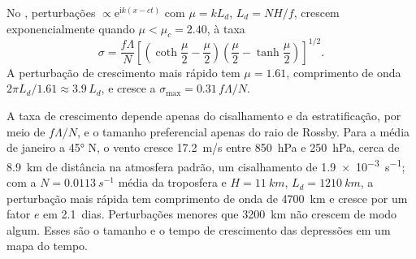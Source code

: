 \begin{theorem}\label{thm:b3:atmospheric-dynamics:eady}
No , perturbações $\propto \mathrm e^{\mathrm ik(x - ct)}$
com $\mu = kL_d$, $L_d = NH/f$, crescem exponencialmente quando $\mu < \mu_c =
2.40$, à taxa
\[
\sigma = \frac{f\Lambda}{N}\left[\left(\coth\frac{\mu}{2} - \frac{\mu}{2}\right)\left(\frac{\mu}{2} - \tanh\frac{\mu}{2}\right)\right]^{1/2} .
\]
A perturbação de crescimento mais rápido tem $\mu = 1.61$, comprimento de onda $2\pi L_d/1.61
\approx 3.9\,L_d$, e cresce a $\sigma_{\max} = 0.31\,f\Lambda/N$.
\end{theorem}
\admitted

A taxa de crescimento depende apenas do cisalhamento e da estratificação, por meio de
$f\Lambda/N$, e o tamanho preferencial apenas do raio de Rossby. Para a
média de janeiro a \ang{45} N, o vento cresce \qty{17.2}{m/s} entre
\qty{850}{hPa} e \qty{250}{hPa}, cerca de \qty{8.9}{km} de distância na
atmosfera padrão, um cisalhamento de \qty{1.9e-3}{s^{-1}}; com a  $N = \qty{0.0113}{s^{-1}}$ média da troposfera e $H = \qty{11}{km}$, $L_d =
\qty{1210}{km}$, a perturbação mais rápida tem comprimento de onda de \qty{4700}{km}
e cresce por um fator $e$ em \num{2.1}~dias. Perturbações menores que
\qty{3200}{km} não crescem de modo algum. Esses são o tamanho e o tempo de crescimento
das depressões em um mapa do tempo.

